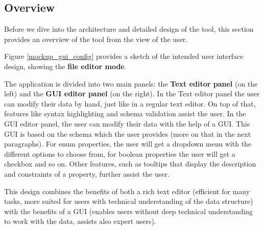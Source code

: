 
\subsection{Overview}\label{subsec:overview} %
Before we dive into the architecture and detailed design of the tool, this section provides an overview of the tool from the view of the user.

Figure \ref{mockup_gui_config} provides a sketch of the intended user interface design, showing the \textbf{file editor mode}.

The application is divided into two main panels: the  \textbf{Text editor panel} (on the left) and the \textbf{GUI editor panel} (on the right).
In the Text editor panel the user can modify their data by hand, just like in a regular text editor.
On top of that, features like syntax highlighting and schema validation assist the user.
In the GUI editor panel, the user can modify their data with the help of a GUI.
This GUI is based on the schema which the user provides (more on that in the next paragraphs).
For enum properties, the user will get a dropdown menu with the different options to choose from, for boolean properties the user will get a checkbox and so on.
Other features, such as tooltips that display the description and constraints of a property, further assist the user.

This design combines the benefits of both a rich text editor (efficient for many tasks, more suited for users with technical understanding of the data structure) with the benefits of a GUI (enables users without deep technical understanding to work with the data, assists also expert users).


